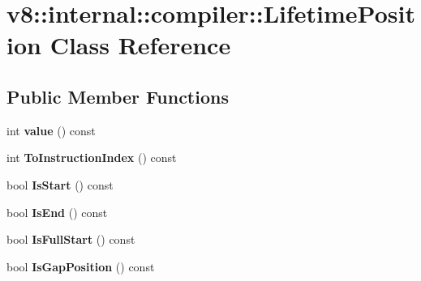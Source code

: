 \hypertarget{classv8_1_1internal_1_1compiler_1_1_lifetime_position}{}\section{v8\+:\+:internal\+:\+:compiler\+:\+:Lifetime\+Position Class Reference}
\label{classv8_1_1internal_1_1compiler_1_1_lifetime_position}
\subsection*{Public Member Functions}
\begin{DoxyCompactItemize}
\item 
int {\bfseries value} () const \hypertarget{classv8_1_1internal_1_1compiler_1_1_lifetime_position_a780101f7e6ac4a2a24e5ab0362cb36bf}{}\label{classv8_1_1internal_1_1compiler_1_1_lifetime_position_a780101f7e6ac4a2a24e5ab0362cb36bf}

\item 
int {\bfseries To\+Instruction\+Index} () const \hypertarget{classv8_1_1internal_1_1compiler_1_1_lifetime_position_ae392770ee5b121f24b62ac5b3b094fde}{}\label{classv8_1_1internal_1_1compiler_1_1_lifetime_position_ae392770ee5b121f24b62ac5b3b094fde}

\item 
bool {\bfseries Is\+Start} () const \hypertarget{classv8_1_1internal_1_1compiler_1_1_lifetime_position_a538045933626e3f7acabd76b35c7f4e8}{}\label{classv8_1_1internal_1_1compiler_1_1_lifetime_position_a538045933626e3f7acabd76b35c7f4e8}

\item 
bool {\bfseries Is\+End} () const \hypertarget{classv8_1_1internal_1_1compiler_1_1_lifetime_position_ab0585f113b28d42352e9462231332f48}{}\label{classv8_1_1internal_1_1compiler_1_1_lifetime_position_ab0585f113b28d42352e9462231332f48}

\item 
bool {\bfseries Is\+Full\+Start} () const \hypertarget{classv8_1_1internal_1_1compiler_1_1_lifetime_position_af704c71dcb8e802958d54760acde8ad2}{}\label{classv8_1_1internal_1_1compiler_1_1_lifetime_position_af704c71dcb8e802958d54760acde8ad2}

\item 
bool {\bfseries Is\+Gap\+Position} () const \hypertarget{classv8_1_1internal_1_1compiler_1_1_lifetime_position_a65ead47f40608024097e49915dcac2dc}{}\label{classv8_1_1internal_1_1compiler_1_1_lifetime_position_a65ead47f40608024097e49915dcac2dc}


\end{DoxyCompactItemize}
